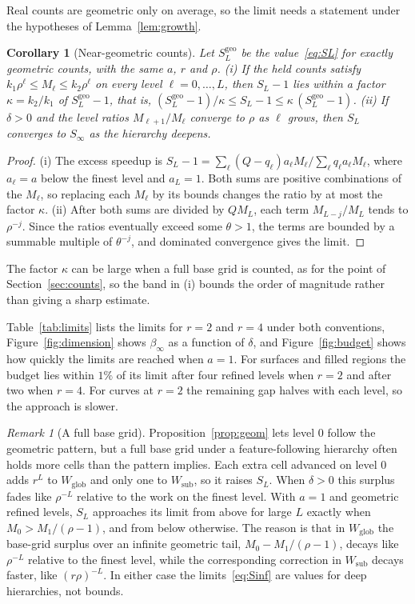 \documentclass[12pt]{article}
\newtheorem{corollary}{Corollary}
\theoremstyle{remark}
\newtheorem{remark}{Remark}
\newcommand{\WG}{W_{\mathrm{glob}}}
\newcommand{\WL}{W_{\mathrm{sub}}}
\begin{document}
Real counts are geometric only on average, so the limit needs a statement under the hypotheses of Lemma~\ref{lem:growth}.

\begin{corollary}[Near-geometric counts]\label{cor:near}
Let $S_L^{\mathrm{geo}}$ be the value~\eqref{eq:SL} for exactly geometric counts, with the same $a$, $r$ and $\rho$. (i) If the held counts satisfy $k_1\rho^\ell\le M_\ell\le k_2\rho^\ell$ on every level $\ell=0,\dots,L$, then $S_L-1$ lies within a factor $\kappa=k_2/k_1$ of $S_L^{\mathrm{geo}}-1$, that is, $(S_L^{\mathrm{geo}}-1)/\kappa\le S_L-1\le\kappa\,(S_L^{\mathrm{geo}}-1)$. (ii) If $\delta>0$ and the level ratios $M_{\ell+1}/M_\ell$ converge to $\rho$ as $\ell$ grows, then $S_L$ converges to $S_\infty$ as the hierarchy deepens.
\end{corollary}

\begin{proof}
(i) The excess speedup is $S_L-1=\sum_\ell(Q-q_\ell)a_\ell M_\ell/\sum_\ell q_\ell a_\ell M_\ell$, where $a_\ell=a$ below the finest level and $a_L=1$. Both sums are positive combinations of the $M_\ell$, so replacing each $M_\ell$ by its bounds changes the ratio by at most the factor $\kappa$. (ii) After both sums are divided by $QM_L$, each term $M_{L-j}/M_L$ tends to $\rho^{-j}$. Since the ratios eventually exceed some $\theta>1$, the terms are bounded by a summable multiple of $\theta^{-j}$, and dominated convergence gives the limit.
\end{proof}

The factor $\kappa$ can be large when a full base grid is counted, as for the point of Section~\ref{sec:counts}, so the band in (i) bounds the order of magnitude rather than giving a sharp estimate.

Table~\ref{tab:limits} lists the limits for $r=2$ and $r=4$ under both conventions, Figure~\ref{fig:dimension} shows $\beta_\infty$ as a function of $\delta$, and Figure~\ref{fig:budget} shows how quickly the limits are reached when $a=1$. For surfaces and filled regions the budget lies within $1\%$ of its limit after four refined levels when $r=2$ and after two when $r=4$. For curves at $r=2$ the remaining gap halves with each level, so the approach is slower.

\begin{remark}[A full base grid]\label{rem:base}
Proposition~\ref{prop:geom} lets level 0 follow the geometric pattern, but a full base grid under a feature-following hierarchy often holds more cells than the pattern implies. Each extra cell advanced on level 0 adds $r^L$ to $\WG$ and only one to $\WL$, so it raises $S_L$. When $\delta>0$ this surplus fades like $\rho^{-L}$ relative to the work on the finest level. With $a=1$ and geometric refined levels, $S_L$ approaches its limit from above for large $L$ exactly when $M_0>M_1/(\rho-1)$, and from below otherwise. The reason is that in $\WG$ the base-grid surplus over an infinite geometric tail, $M_0-M_1/(\rho-1)$, decays like $\rho^{-L}$ relative to the finest level, while the corresponding correction in $\WL$ decays faster, like $(r\rho)^{-L}$. In either case the limits~\eqref{eq:Sinf} are values for deep hierarchies, not bounds.
\end{remark}
\end{document}
